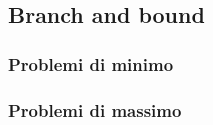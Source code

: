 \begin{multicols}{2}
\subsection*{Branch and bound}
\subsubsection*{Problemi di minimo}
\subsubsection*{Problemi di massimo}


\end{multicols}
\restoregeometry